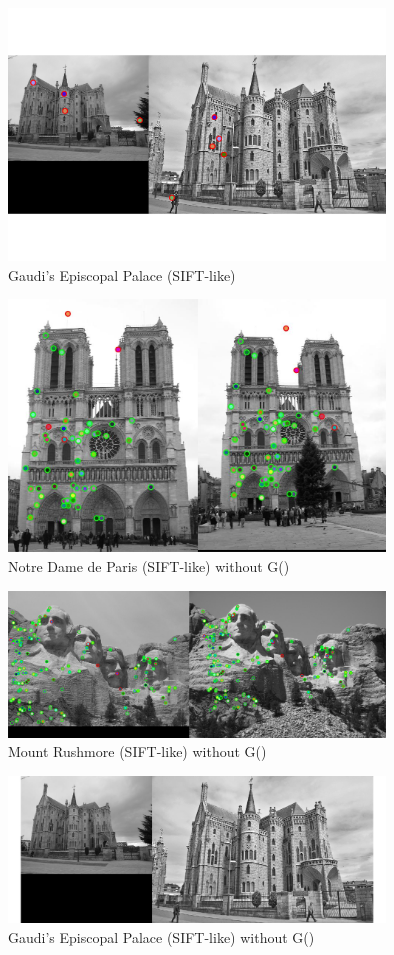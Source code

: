 \begin{figure}[h]
    \centering
    \includegraphics[width=10cm]{writeup/eval_EG.png}
    \caption{Gaudi's Episcopal Palace (SIFT-like)}
    \label{fig:result6}
\end{figure}

\begin{figure}[h]
    \centering
    \includegraphics[width=10cm]{writeup/eval_ND without G.jpg}
    \caption{Notre Dame de Paris (SIFT-like) without G()}
    \label{fig:result7}
\end{figure}

\begin{figure}[h]
    \centering
    \includegraphics[width=10cm]{writeup/eval_MR without G.jpg}
    \caption{Mount Rushmore (SIFT-like) without G()}
    \label{fig:result8}
\end{figure}

\begin{figure}[h]
    \centering
    \includegraphics[width=10cm]{writeup/eval_EG without G.jpg}
    \caption{Gaudi's Episcopal Palace (SIFT-like) without G()}
    \label{fig:result9}
\end{figure}


